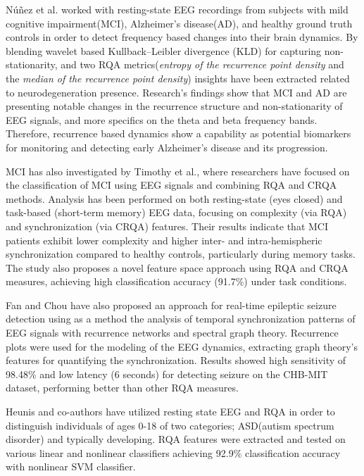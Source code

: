 \documentclass{article}
\begin{document}
			Núñez et al. \cite{nunez2020characterization} worked with 
			resting-state EEG recordings from subjects with mild cognitive impairment(MCI), 
			Alzheimer's disease(AD), and healthy ground truth controls in order to detect 
			frequency based changes into their brain dynamics. 
			By blending wavelet based Kullback–Leibler divergence
			(KLD) for capturing non-stationarity,
			and two RQA
			metrics(\textit{entropy of the recurrence point density}
			and the \textit{median of the recurrence point density}) insights have been
			extracted related to neurodegeneration presence.
			Research's findings show that MCI and AD are presenting notable changes in 
			the recurrence structure and non-stationarity of EEG signals,
			and more specifics on the theta and beta frequency bands.
			Therefore, recurrence based dynamics show a capability as potential 
			biomarkers for monitoring and detecting early Alzheimer's disease and its progression.

			MCI has also investigated by Timothy et al.\cite{timothy2017classification}, where 
			researchers have focused on 
			the classification of MCI using EEG signals and 
			combining RQA and CRQA methods. Analysis has been performed on both resting-state 
			(eyes closed) and task-based (short-term memory) EEG data, 
			focusing on complexity (via RQA) and synchronization (via CRQA) features. 
			Their results indicate that MCI patients exhibit lower complexity
			and higher inter- and intra-hemispheric synchronization compared to healthy controls, 
			particularly during memory tasks. 
			The study also proposes a novel feature space approach using RQA and CRQA measures, 
			achieving high classification accuracy (91.7\%) under task conditions. 
				


			Fan and Chou \cite{fan2019detecting} have also proposed 
			an approach for real-time epileptic seizure detection
			using as a method the analysis of temporal synchronization 
			patterns of EEG signals with recurrence networks and spectral graph theory. 
			Recurrence plots were used for the modeling of the EEG dynamics, 
			extracting graph theory's features for quantifying the synchronization. 
			Results showed high sensitivity of 98.48\% and low latency
			(6 seconds) for detecting seizure on the CHB-MIT dataset, 
			performing better than other RQA measures.  

			Heunis and co-authors\cite{heunis2018} have utilized resting state EEG and RQA in order to
			distinguish individuals of ages 0-18 of two categories; ASD(autism spectrum disorder) and typically developing.
			RQA features were extracted and tested on various linear and nonlinear classifiers achieving 92.9\% classification
			accuracy with nonlinear SVM classifier.
\end{document}
